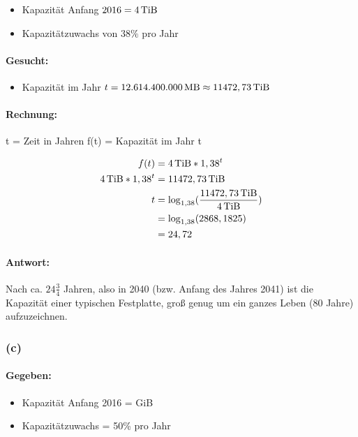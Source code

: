 \documentclass[11pt,a4paper]{article}
\begin{document}
\begin{itemize}
    \item Kapazität Anfang $2016 = \unit[4]{TiB}$
    \item Kapazitätzuwachs von $38\%$ pro Jahr
\end{itemize}

\paragraph{Gesucht:}

\begin{itemize}
    \item Kapazität im Jahr $t = \unit[12.614.400.000]{MB} \approx \unit[11472,73]{TiB}$
\end{itemize}

\paragraph{Rechnung:}

    t = Zeit in Jahren
    f(t) = Kapazität im Jahr t

\begin{align}
    f(t) &= \unit[4]{TiB}*1,38^{t}\\
    \unit[4]{TiB} * 1,38^{t} &= \unit[11472,73]{TiB}\\
    t &= \log_{1,38}(\frac{\unit[11472,73]{TiB}}{\unit[4]{TiB}})\\
      &= \log_{1,38}(2868,1825)\\
      &= 24,72
\end{align}

\paragraph{Antwort:}
Nach ca. $24\frac{3}{4}$ Jahren, also in 2040 (bzw. Anfang des Jahres 2041) ist die Kapazität einer typischen Festplatte, groß genug um ein ganzes Leben (80 Jahre) aufzuzeichnen.


\subsubsection{(c)} %

\paragraph{Gegeben:}
\begin{itemize}
    \item Kapazität Anfang 2016 = \unit[128]{GiB}\\
    \item Kapazitätzuwachs = 50\% pro Jahr
\end{itemize}
\end{document}
